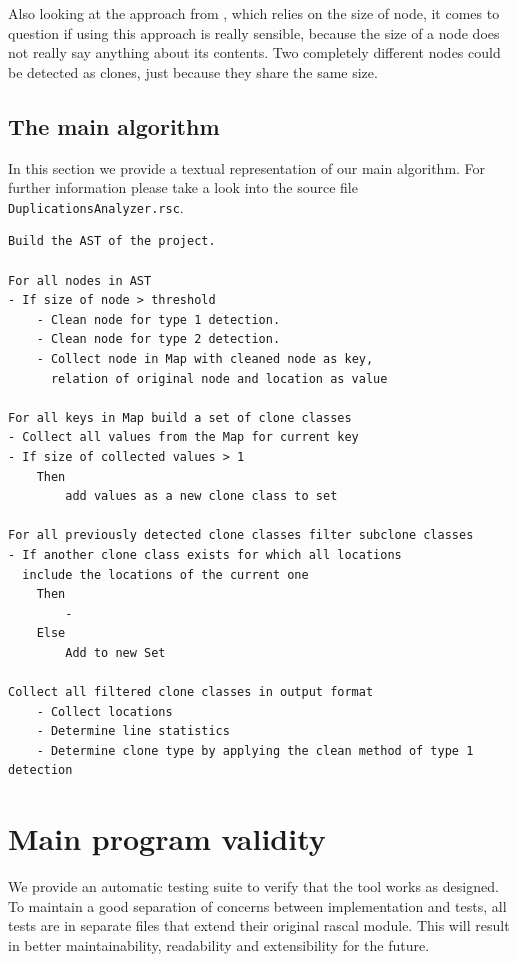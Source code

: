 \documentclass{uva-inf-article}
\begin{document}
Also looking at the approach from \cite{baxter1998clone}, which relies on the size of node, it comes to question if using this approach is really sensible, because the size of a node does not really say anything about its contents. Two completely different nodes could be detected as clones, just because they share the same size.

\subsection{The main algorithm}

In this section we provide a textual representation of our main algorithm. For further information please take a look into the source file \texttt{DuplicationsAnalyzer.rsc}.

\begin{lstlisting}[style=pseudocodeStyle,caption={General algorithm preudocode},captionpos=b]
Build the AST of the project.

For all nodes in AST 
- If size of node > threshold
	- Clean node for type 1 detection.
	- Clean node for type 2 detection.
	- Collect node in Map with cleaned node as key, 
  	  relation of original node and location as value

For all keys in Map build a set of clone classes
- Collect all values from the Map for current key
- If size of collected values > 1 
	Then 
		add values as a new clone class to set

For all previously detected clone classes filter subclone classes
- If another clone class exists for which all locations 
  include the locations of the current one 
 	Then
		-
	Else
		Add to new Set

Collect all filtered clone classes in output format
	- Collect locations
	- Determine line statistics
	- Determine clone type by applying the clean method of type 1 detection

\end{lstlisting}

\section{Main program validity}

We provide an automatic testing suite to verify that the tool works as designed. To maintain a good separation of concerns between implementation and tests, all tests are in separate files that extend their original rascal module. This will result in better maintainability, readability and extensibility for the future. 
\end{document}

